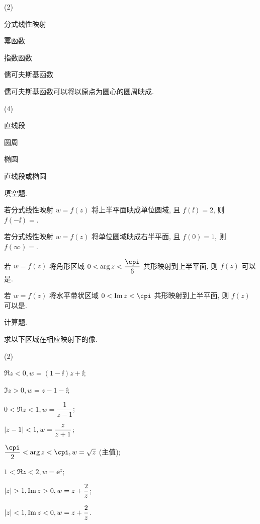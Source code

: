 \begin{homework}
\begin{homework}
    \begin{exchoice}(2)
      \item 分式线性映射
      \item 幂函数
      \item 指数函数
      \item 儒可夫斯基函数
    \end{exchoice}
    \item 儒可夫斯基函数可以将以原点为圆心的圆周映成\fillbrace{}.
    \begin{exchoice}(4)
      \item 直线段
      \item 圆周
      \item 椭圆
      \item 直线段或椭圆
    \end{exchoice}
  \end{homework}
  \item 填空题.
  \begin{homework}
    \item 若分式线性映射 $w=f(z)$ 将上半平面映成单位圆域, 且 $f(\ii)=2$, 则 $f(-\ii)=$\fillblank[7mm]{}.
    \item 若分式线性映射 $w=f(z)$ 将单位圆域映成右半平面, 且 $f(0)=1$, 则 $f(\infty)=$\fillblank[7mm]{}.
    \item 若 $w=f(z)$ 将角形区域 $0<\arg z<\dfrac\cpi6$ 共形映射到上半平面, 则 $f(z)$ 可以是\fillblank{}.
    \item 若 $w=f(z)$ 将水平带状区域 $0<\Im z<\cpi$ 共形映射到上半平面, 则 $f(z)$ 可以是\fillblank{}.
  \end{homework}
  \item 计算题.
  \begin{homework}
    \item 求以下区域在相应映射下的像.
    \begin{subhomework}(2)
      \item $\Re z<0, w=(1-\ii)z+\ii$;
      \item $\Im z>0, w=z-1-\ii$;
      \item $0<\Re z<1, w=\dfrac1{z-1}$;
      \item $\left|z-1\right|<1, w=\dfrac z{z+1}$;
      \item $\dfrac\cpi2<\arg z<\cpi, w=\sqrt z$ (主值);
      \item $1<\Re z<2, w=\ee^z$;
      \item $\abs{z}>1, \Im z>0, w=z+\dfrac 2z$;
      \item $\left|z\right|<1, \operatorname{Im} z<0, w=z+\dfrac 2z$.
    \end{subhomework}

\end{homework}
\end{homework}
